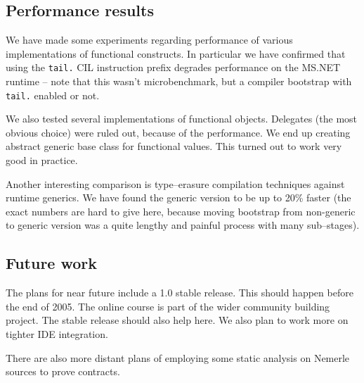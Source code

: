 \documentclass{article}
\begin{document}
\subsection{Performance results}

We have made some experiments regarding performance of various
implementations of functional constructs. In particular we have confirmed
that using the {\tt tail.} CIL instruction prefix degrades performance
on the MS.NET runtime -- note that this wasn't microbenchmark, but
a compiler bootstrap with {\tt tail.} enabled or not.

We also tested several implementations of functional objects. Delegates
(the most obvious choice) were ruled out, because of the performance.
We end up creating abstract generic base class for functional values.
This turned out to work very good in practice.

Another interesting comparison is type--erasure compilation techniques
against runtime generics. We have found the generic version to be up
to 20\% faster (the exact numbers are hard to give here, because moving
bootstrap from non-generic to generic version was a quite lengthy
and painful process with many sub--stages).

\subsection{Future work}

The plans for near future include a 1.0 stable release. This should happen
before the end of 2005. The online course is part of the wider community
building project. The stable release should also help here. We also plan to
work more on tighter IDE integration.

There are also more distant plans of employing some static analysis on
Nemerle sources to prove contracts.
\end{document}
